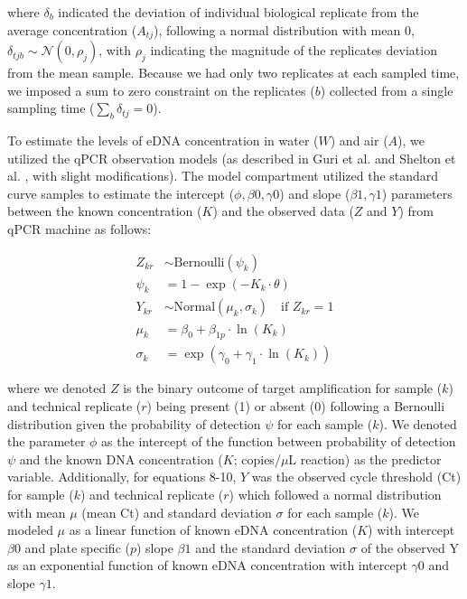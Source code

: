 \documentclass{article}
\begin{document}
where $\delta_b$ indicated the deviation of individual biological replicate from the average concentration ($A_{tj}$), following a normal distribution with mean 0, $\delta_{tjb} \sim \mathcal{N}(0,\rho_j)$, with $\rho_j$ indicating the magnitude of the replicates deviation from the mean sample. Because we had only two replicates at each sampled time, we imposed a sum to zero constraint on the replicates ($b$) collected from a single sampling time ($\sum_b \delta_{tj} = 0$).

To estimate the levels of eDNA concentration in water ($W$) and air ($A$), we utilized the qPCR observation models (as described in Guri et al. \cite{guri2024} and Shelton et al. \cite{shelton2022}, with slight modifications). The model compartment utilized the standard curve samples to estimate the intercept ($\phi,\beta0,\gamma0$) and slope ($\beta1, \gamma1$) parameters between the known concentration ($K$) and the observed data ($Z$ and $Y$) from qPCR machine as follows:

\begin{align}
    Z_{kr} &\sim \mathrm{Bernoulli} \left(\psi_{k}\right)  \\
    \psi_{k} &= 1 - \exp(-K_{k} \cdot \theta) \\
    Y_{kr} &\sim \mathrm{Normal} (\mu_{k}, \sigma_{k}) \quad \text{if } Z_{kr} = 1 \\
    \mu_{k} &= \beta_0 + \beta_{1p} \cdot \ln (K_{k}) \\
    \sigma_{k} &= \exp(\gamma_0 + \gamma_1 \cdot \ln (K_{k}))
\end{align}

where we denoted $Z$ is the binary outcome of target amplification for sample ($k$) and technical replicate ($r$) being present (1) or absent (0) following a Bernoulli distribution given the probability of detection $\psi$ for each sample ($k$). We denoted the parameter $\phi$ as the intercept of the function between probability of detection $\psi$ and the known DNA concentration ($K$; copies/$\mu$L reaction) as the predictor variable. Additionally, for equations 8-10, $Y$ was the observed cycle threshold (Ct) for sample ($k$) and technical replicate ($r$) which followed a normal distribution with mean $\mu$ (mean Ct) and standard deviation $\sigma$ for each sample ($k$). We modeled $\mu$ as a linear function of known eDNA concentration ($K$) with intercept $\beta0$ and plate specific ($p$) slope $\beta1$ and the standard deviation $\sigma$ of the observed Y as an exponential function of known eDNA concentration with intercept $\gamma0$ and slope $\gamma1$.
\end{document}
